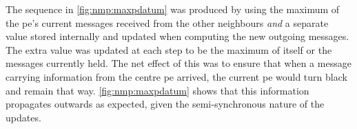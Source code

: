 The sequence in \autoref{fig:nmp:maxpdatum} was produced by using the maximum of the \gls{pe}'s current messages received from the other neighbours \emph{and} a separate value stored internally and updated when computing the new outgoing messages.  The extra value was updated at each step to be the maximum of itself or the messages currently held.  The net effect of this was to ensure that when a message carrying information from the centre \gls{pe} arrived, the current \gls{pe} would turn black and remain that way.  \autoref{fig:nmp:maxpdatum} shows that this information propagates outwards as expected, given the semi-synchronous nature of the updates.

\begin{figure}
    \centering

\end{figure}
